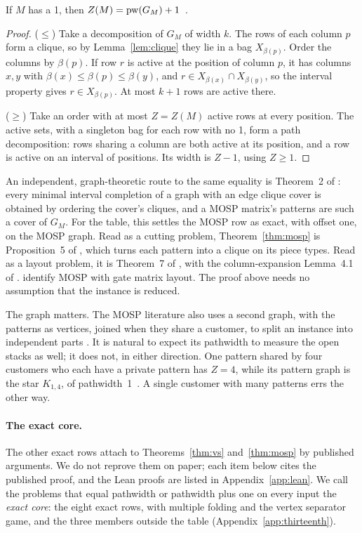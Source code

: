 \begin{theorem}\label{thm:mosp}
If $M$ has a 1, then $Z(M)=\mathrm{pw}(G_M)+1$~.
\end{theorem}
\begin{proof}
($\le$) Take a decomposition of $G_M$ of width $k$. The rows of each column $p$
form a clique, so by Lemma~\ref{lem:clique} they lie in a bag $X_{\beta(p)}$.
Order the columns by $\beta(p)$. If row $r$ is active at the position of column
$p$, it has columns $x,y$ with $\beta(x)\le\beta(p)\le\beta(y)$, and
$r\in X_{\beta(x)}\cap X_{\beta(y)}$, so the interval property gives
$r\in X_{\beta(p)}$. At most $k+1$ rows are active there.

($\ge$) Take an order with at most $Z=Z(M)$ active rows at every position. The
active sets, with a singleton bag for each row with no 1, form a path
decomposition: rows sharing a column are both active at its position, and a row
is active on an interval of positions. Its width is $Z-1$, using $Z\ge1$.
\end{proof}
An independent, graph-theoretic route to the same equality is Theorem~2 of
\citet{SuchanTodinca2007}: every minimal interval completion of a graph with an
edge clique cover is obtained by ordering the cover's cliques, and a MOSP
matrix's patterns are such a cover of $G_M$.
For the table, this settles the MOSP row as exact, with offset one, on the MOSP
graph. Read as a cutting problem, Theorem~\ref{thm:mosp} is Proposition~5 of
\citet{Yanasse1997a}, which turns each pattern into a clique on its piece types.
Read as a layout problem, it is Theorem~7 of \citet{FellowsLangston1989}, with
the column-expansion Lemma~4.1 of \citet{FellowsLangston1987}.
\citet[Prop.~2]{LY2002} identify MOSP with gate matrix layout. The proof above
needs no assumption that the instance is reduced.

The graph matters. The MOSP literature also uses a second graph, with the
patterns as vertices, joined when they share a customer, to split an instance
into independent parts \citep{YanasseSenne2010}. It is natural to expect its
pathwidth to measure the open stacks as well; it does not, in either
direction. One pattern shared by four customers who each have a private
pattern has $Z=4$, while its pattern graph is the star $K_{1,4}$, of
pathwidth~1~. A single customer with many patterns errs the
other way.

\paragraph{The exact core.} The other exact rows attach to
Theorems~\ref{thm:vs} and~\ref{thm:mosp} by published arguments. We do not
reprove them on paper; each item below cites the published proof, and the Lean
proofs are listed in Appendix~\ref{app:lean}. We call the problems that equal
pathwidth or pathwidth plus one on every input the \emph{exact core}: the eight
exact rows, with multiple folding and the vertex separator game, and the three
members outside the table (Appendix~\ref{app:thirteenth}).


